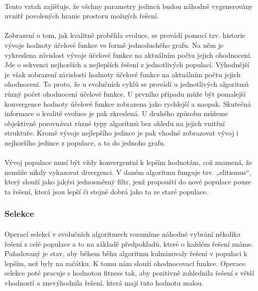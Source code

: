 \documentclass[bc,male,java,dept460]{diploma}		%
\begin{document}
\paragraph*{}
Tento vztah zajišťuje, že všchny parametry jedinců budou náhodně vygenerovány uvnitř povolených hranic prostoru možných řešení.
\paragraph*{}
Zobrazení o tom, jak kvalitně proběhla evoluce, se provádí pomocí tzv. historie vývoje hodnoty účelové funkce ve formě jednoduchého grafu. Na něm je vykreslena závislost vývoje účelové funkce na aktuálním počtu jejich ohodnocení. Jde o sekvenci nejhorších a nejlepších řešení z jednotlivých populací. Výhodnější je však zobrazení závislosti hodnoty účelové funkce na aktuálním počtu jejich ohodnocení. To proto, že u evolučních cyklů se provádí u jednotlivých algoritmů různý počet ohodnocení účelové funkce. U prvního případu může být pomalejší konvergence hodnoty účelové funkce zobrazena jako rychlejší a naopak. Skutečná informace o kvalitě evoluce je pak zkreslená. U druhého způsobu můžeme objektivně porovnávat různé typy algoritmů bez ohledu na jejich vnitřní struktuře.
Kromě vývoje nejlepšího jedince je pak vhodné zobrazovat vývoj i nejhoršího jedince z populace, a to do jednoho grafu.
\paragraph*{}
Vývoj populace musí být vždy konvergentní k lepším hodnotám, což znamená, že nemůže nikdy vykazovat divergenci. V daném algoritmu funguje tzv. „elitismus“, který slouží jako jakýsi jednosměrný filtr, jenž propouští do nové populace pouze ta řešení, která jsou lepší či stejně dobrá jako ta ze staré populace.

\subsubsection{Selekce}
\paragraph*{}
Operací selekcí v evolučních algoritmech rozumíme náhodné vybrání několika řešení z celé populace a to na základě předpokladů, které o každém řešení známe. Požadovaný je stav, aby během běhu algoritmu kulminovaly řešení v populaci k lepším, než byly na začátku. K tomu nám slouží ohodnocovací funkce. Operace selekce poté pracuje s hodnotou fitness tak, aby pozitivně zohlednila řešení s větší vhodností a znevýhodnila řešení, která mají tuto hodnotu malou.
\end{document}
